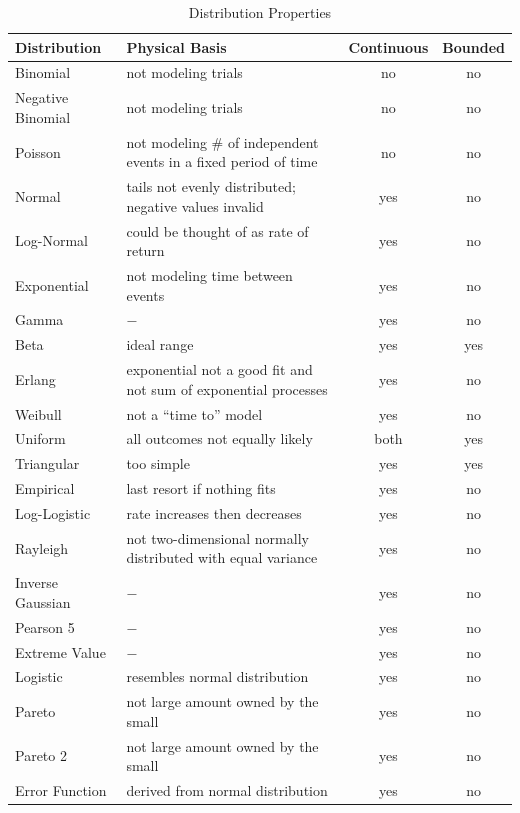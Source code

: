 \documentclass{article}
\begin{document}
\begin{table}[htbp]
\centering
\begin{tabular}{ l p{} c c }

\toprule
Distribution & Physical Basis & Continuous & Bounded \\
\midrule

Binomial          & not modeling trials                   & no   & no  \\
Negative Binomial & not modeling trials                   & no   & no  \\
Poisson           & not modeling \# of independent
                    events in a fixed period of time      & no   & no  \\
Normal            & tails not evenly distributed;
                    negative values invalid               & yes  & no  \\
Log-Normal        & could be thought of as rate of return & yes  & no  \\
Exponential       & not modeling time between events      & yes  & no  \\
Gamma             & $-$                                   & yes  & no  \\
Beta              & ideal range                           & yes  & yes \\
Erlang            & exponential not a good fit and not
                    sum of exponential processes          & yes  & no  \\
Weibull           & not a ``time to'' model               & yes  & no  \\
Uniform           & all outcomes not equally likely       & both & yes \\
Triangular        & too simple                            & yes  & yes \\
Empirical         & last resort if nothing fits           & yes  & no  \\
Log-Logistic      & rate increases then decreases         & yes  & no  \\
Rayleigh          & not two-dimensional normally
                    distributed with equal variance       & yes  & no  \\
Inverse Gaussian  & $-$                                   & yes  & no  \\
Pearson 5         & $-$                                   & yes  & no  \\
Extreme Value     & $-$                                   & yes  & no  \\
Logistic          & resembles normal distribution         & yes  & no  \\
Pareto            & not large amount owned by the small   & yes  & no  \\
Pareto 2          & not large amount owned by the small   & yes  & no  \\
Error Function    & derived from normal distribution      & yes  & no  \\
\bottomrule

\end{tabular}
\caption{Distribution Properties}
\label{prop}
\end{table}
\end{document}
